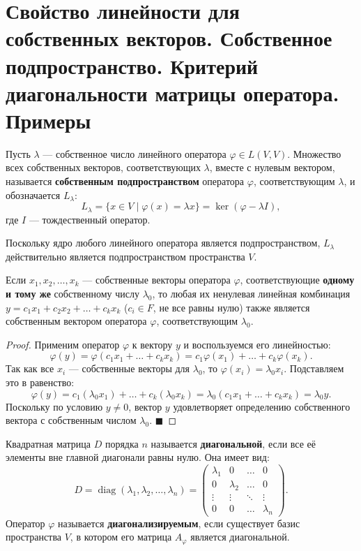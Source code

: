 \section{Свойство линейности для собственных векторов. Собственное подпространство. Критерий диагональности матрицы оператора. Примеры}

\begin{definition}
Пусть $\lambda$ --- собственное число линейного оператора $\varphi \in L(V, V)$. Множество всех собственных векторов, соответствующих $\lambda$, вместе с нулевым вектором, называется \textbf{собственным подпространством} оператора $\varphi$, соответствующим $\lambda$, и обозначается $L_\lambda$:
\[
L_\lambda = \{ x \in V \mid \varphi(x) = \lambda x \} = \ker(\varphi - \lambda I),
\]
где $I$ --- тождественный оператор.
\end{definition}

\begin{remark}
Поскольку ядро любого линейного оператора является подпространством, $L_\lambda$ действительно является подпространством пространства $V$.
\end{remark}

\begin{theorem}
Если $x_1, x_2, \dots, x_k$ --- собственные векторы оператора $\varphi$, соответствующие \textbf{одному и тому же} собственному числу $\lambda_0$, то любая их ненулевая линейная комбинация $y = c_1 x_1 + c_2 x_2 + \dots + c_k x_k$ ($c_i \in F$, не все равны нулю) также является собственным вектором оператора $\varphi$, соответствующим $\lambda_0$.
\end{theorem}

\begin{proof}
Применим оператор $\varphi$ к вектору $y$ и воспользуемся его линейностью:
\[
\varphi(y) = \varphi(c_1 x_1 + \dots + c_k x_k) = c_1 \varphi(x_1) + \dots + c_k \varphi(x_k).
\]
Так как все $x_i$ --- собственные векторы для $\lambda_0$, то $\varphi(x_i) = \lambda_0 x_i$. Подставляем это в равенство:
\[
\varphi(y) = c_1 (\lambda_0 x_1) + \dots + c_k (\lambda_0 x_k) = \lambda_0 (c_1 x_1 + \dots + c_k x_k) = \lambda_0 y.
\]
Поскольку по условию $y \neq 0$, вектор $y$ удовлетворяет определению собственного вектора с собственным числом $\lambda_0$.
\hfill$\blacksquare$
\end{proof}

\begin{definition}
Квадратная матрица $D$ порядка $n$ называется \textbf{диагональной}, если все её элементы вне главной диагонали равны нулю. Она имеет вид:
\[
D = \operatorname{diag}(\lambda_1, \lambda_2, \dots, \lambda_n) = 
\begin{pmatrix}
\lambda_1 & 0 & \dots & 0 \\
0 & \lambda_2 & \dots & 0 \\
\vdots & \vdots & \ddots & \vdots \\
0 & 0 & \dots & \lambda_n
\end{pmatrix}.
\]
Оператор $\varphi$ называется \textbf{диагонализируемым}, если существует базис пространства $V$, в котором его матрица $A_\varphi$ является диагональной.
\end{definition}


